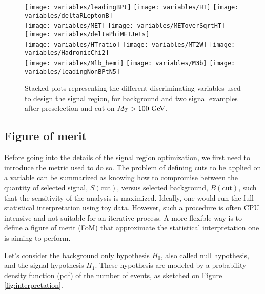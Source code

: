             \begin{figure}[h!]
                \centering
                \texttt{[image: variables/leadingBPt]}
                \texttt{[image: variables/HT]}
                \texttt{[image: variables/deltaRLeptonB]}\\
                \texttt{[image: variables/MET]}
                \texttt{[image: variables/METoverSqrtHT]}
                \texttt{[image: variables/deltaPhiMETJets]}\\
                \texttt{[image: variables/HTratio]}
                \texttt{[image: variables/MT2W]}
                \texttt{[image: variables/HadronicChi2]}\\
                \texttt{[image: variables/Mlb\_hemi]}
                \texttt{[image: variables/M3b]}
                \texttt{[image: variables/leadingNonBPtN5]}
                \caption{Stacked plots representing the different discriminating variables used to design the signal region, for background and two signal examples after preselection and cut on $M_T > 100 ~\text{GeV}$.}
                \label{fig:variables}
            \end{figure}

            \subsection{Figure of merit}

            Before going into the details of the signal region optimization, we first need to introduce the
            metric used to do so. The problem of defining cuts to be applied on a variable can be summarized 
            as knowing how to compromise between the quantity of selected signal, $S(\text{cut})$, versus selected
            background, $B(\text{cut})$, such that the sensitivity of the analysis is maximized. Ideally,
            one would run the full statistical interpretation using toy data. However, such a procedure 
            is often CPU intensive and not suitable for an iterative process. A more flexible way is
            to define a figure of merit (FoM) that approximate the statistical interpretation one is aiming
            to perform.

            Let's consider the background only hypothesis $H_0$, also called null hypothesis, and the 
            signal hypothesis $H_1$. These hypothesis are modeled by a probability density function (pdf) of 
            the number of events, as sketched on Figure \ref{fig:interpretation}.
           
